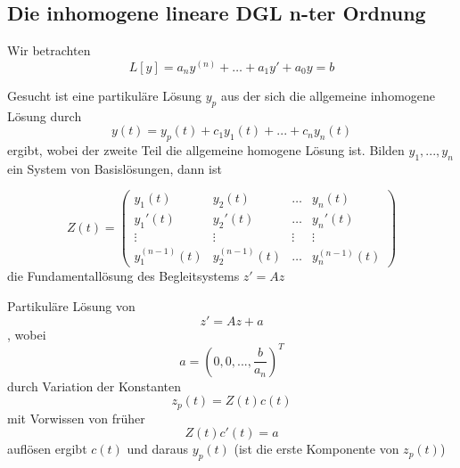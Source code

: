\documentclass[10pt,a4paper]{article}
\begin{document}
\subsection{Die inhomogene lineare DGL n-ter Ordnung}
Wir betrachten $$L[y]=a_n y^{(n)} + \ldots + a_1 y' + a_0y =b$$

Gesucht ist eine partikuläre Lösung $y_p$ aus der sich die allgemeine inhomogene Lösung durch $$y(t)=y_p(t)+c_1 y_1(t)+...+c_n y_n(t)$$ ergibt, wobei der zweite Teil die allgemeine homogene Lösung ist. Bilden $y_1, ..., y_n$ ein System von Basislösungen, dann ist 

$$Z(t)=\begin{pmatrix}
y_1(t) & y_2(t) & \ldots & y_n(t) \\
y_1'(t) & y_2'(t) & \ldots & y_n'(t) \\
\vdots & \vdots & \vdots & \vdots \\
y_1^{(n-1)}(t) & y_2^{(n-1)}(t) & \ldots & y_n^{(n-1)}(t)
\end{pmatrix}$$ die Fundamentallösung des Begleitsystems $z'=Az$

Partikuläre Lösung von $$z'=Az+a$$, wobei $$a=(0,0, ..., \frac{b}{a_n})^{T}$$ durch Variation der Konstanten $$z_p(t)=Z(t)c(t)$$ mit Vorwissen von früher $$Z(t)c'(t)=a$$ auflösen ergibt $c(t)$ und daraus $y_p(t)$ (ist die erste Komponente von $z_p(t)$)
\end{document}
